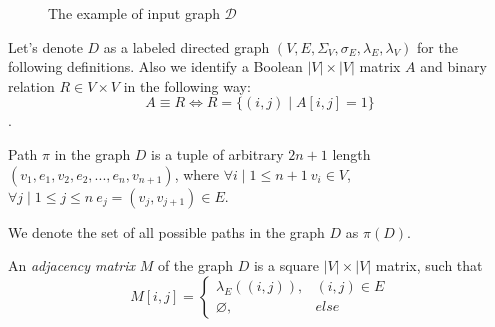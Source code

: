 \begin{figure}[h]
    \centering        
    \caption{The example of input graph $\mathcal{D}$}
    \label{fig:example_input_graph}
\end{figure}


Let's denote $D$ as a labeled directed graph $(V, E, \Sigma_V, \sigma_E, \lambda_E, \lambda_V)$ for the following definitions. Also we identify a Boolean $|V| \times |V|$ matrix $A$ and binary relation $R \in V \times V$ in the following way:
$$A \equiv R \iff R = \{(i, j) \mid A[i, j] = 1\}$$.

\begin{definition}
Path $\pi$ in the graph $D$ is a tuple of arbitrary $2n +1$ length $(v_1, e_1, v_2, e_2, ..., e_n, v_{n+1})$, where $\forall i \mid 1 \leq n+1 ~ v_i \in V$, $\forall j \mid 1 \leq j \leq n ~ e_j=(v_j, v_{j+1}) \in E$.

We denote the set of all possible paths in the graph $D$ as $\pi(D)$. 
\end{definition}

\begin{definition}
An \emph{adjacency matrix} $M$ of the graph $D$ is a square $|V|\times|V|$ matrix, such that 
\begin{equation*}
M[i,j] =
 \begin{cases}
   \lambda_E((i, j)), & (i, j) \in E\\
   \varnothing, & else
 \end{cases}
\end{equation*}
\end{definition}

